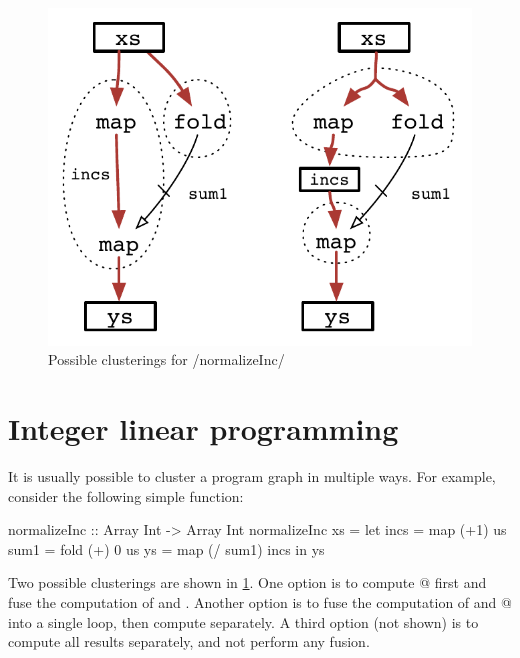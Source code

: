 
\begin{figure}
\begin{center}
\includegraphics[scale=0.5]{copy/03-body/clustering/figures/ex2-normalizeInc.pdf}
\end{center}
\caption{Possible clusterings for \Hs/normalizeInc/}
\label{clustering:f:normalizeInc}
\end{figure}


\section{Integer linear programming}
\label{clustering:s:ILP}
It is usually possible to cluster a program graph in multiple ways.
For example, consider the following simple function:
\begin{haskell}
normalizeInc :: Array Int -> Array Int
normalizeInc xs
 = let incs = map  (+1)     us
       sum1 = fold (+) 0    us
       ys   = map  (/ sum1) incs
   in  ys
\end{haskell}

Two possible clusterings are shown in \cref{clustering:f:normalizeInc}.
One option is to compute @ first and fuse the computation of \Hs@incs@ and \Hs@ys@.
Another option is to fuse the computation of \Hs@incs@ and @ into a single loop, then compute \Hs@ys@ separately.
A third option (not shown) is to compute all results separately, and not perform any fusion. 

